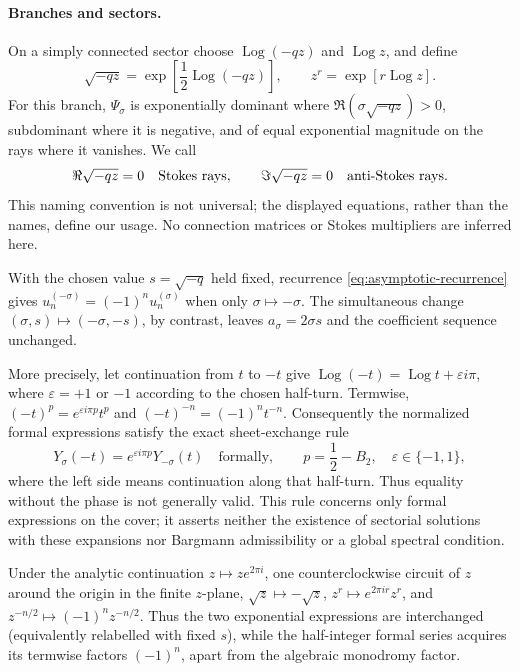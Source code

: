 \documentclass[11pt]{article}
\theoremstyle{remark}
\begin{document}
\paragraph{Branches and sectors.}
On a simply connected sector choose \(\operatorname{Log}(-qz)\) and
\(\operatorname{Log}z\), and define
\[
 \sqrt{-qz}=\exp\!\left[\frac12\operatorname{Log}(-qz)\right],
 \qquad z^r=\exp[r\operatorname{Log}z].
\]
For this branch, \(\Psi_\sigma\) is exponentially dominant where
\(\Re(\sigma\sqrt{-qz})>0\), subdominant where it is negative, and of equal
exponential magnitude on the rays where it vanishes.  We call
\begin{equation}
 \Re\sqrt{-qz}=0\quad\hbox{Stokes rays},\qquad
 \Im\sqrt{-qz}=0\quad\hbox{anti-Stokes rays}.
 \label{eq:stokes-ray-convention}
\end{equation}
This naming convention is not universal; the displayed equations, rather
than the names, define our usage.  No connection matrices or Stokes
multipliers are inferred here.

With the chosen value \(s=\sqrt{-q}\) held fixed, recurrence
\eqref{eq:asymptotic-recurrence} gives
\(u_n^{(-\sigma)}=(-1)^nu_n^{(\sigma)}\) when only
\(\sigma\mapsto-\sigma\).  The simultaneous change
\((\sigma,s)\mapsto(-\sigma,-s)\), by contrast, leaves
\(a_\sigma=2\sigma s\) and the coefficient sequence unchanged.

More precisely, let continuation from \(t\) to \(-t\) give
\(\operatorname{Log}(-t)=\operatorname{Log}t+\varepsilon i\pi\), where
\(\varepsilon=+1\) or \(-1\) according to the chosen half-turn.  Termwise,
\((-t)^p=e^{\varepsilon i\pi p}t^p\) and
\((-t)^{-n}=(-1)^nt^{-n}\).  Consequently the normalized formal expressions
satisfy the exact sheet-exchange rule
\begin{equation}
 Y_\sigma(-t)=e^{\varepsilon i\pi p}Y_{-\sigma}(t)
 \quad\text{formally},
 \qquad p=\frac12-B_2,\quad \varepsilon\in\{-1,1\},
 \label{eq:formal-sheet-exchange}
\end{equation}
where the left side means continuation along that half-turn.  Thus equality
without the phase is not generally valid.  This rule concerns only formal
expressions on the cover; it asserts neither the existence of sectorial
solutions with these expansions nor Bargmann admissibility or a global
spectral condition.

Under the analytic continuation \(z\mapsto ze^{2\pi i}\), one
counterclockwise circuit of \(z\) around the origin in the finite
\(z\)-plane, \(\sqrt z\mapsto-\sqrt z\),
\(z^r\mapsto e^{2\pi ir}z^r\), and
\(z^{-n/2}\mapsto(-1)^nz^{-n/2}\).  Thus the two exponential expressions
are interchanged (equivalently relabelled with fixed \(s\)), while the
half-integer formal series acquires its termwise factors \((-1)^n\), apart
from the algebraic monodromy factor.
\end{document}
